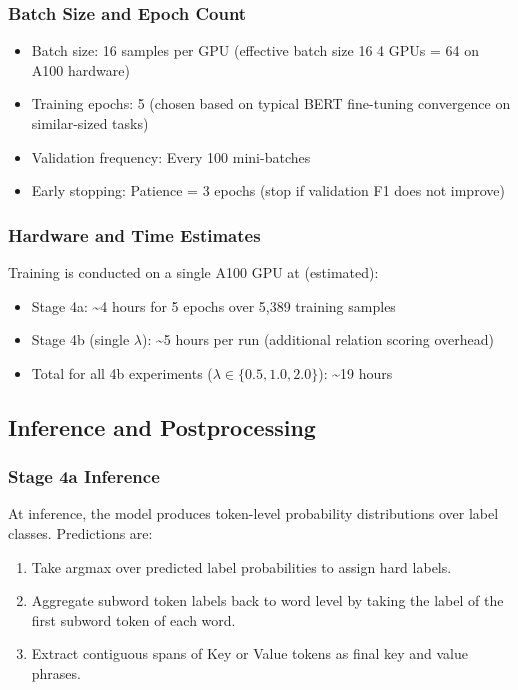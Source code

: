 \subsubsection{Batch Size and Epoch Count}

\begin{itemize}
    \item Batch size: 16 samples per GPU (effective batch size 16 \texttimes{} 4 GPUs = 64 on A100 hardware)
    \item Training epochs: 5 (chosen based on typical BERT fine-tuning convergence on similar-sized tasks)
    \item Validation frequency: Every 100 mini-batches
    \item Early stopping: Patience = 3 epochs (stop if validation F1 does not improve)
\end{itemize}

\subsubsection{Hardware and Time Estimates}

Training is conducted on a single A100 GPU at (estimated):

\begin{itemize}
    \item Stage 4a: \textasciitilde 4 hours for 5 epochs over 5,389 training samples
    \item Stage 4b (single $\lambda$): \textasciitilde 5 hours per run (additional relation scoring overhead)
    \item Total for all 4b experiments ($\lambda \in \{0.5, 1.0, 2.0\}$): \textasciitilde 19 hours
\end{itemize}

\subsection{Inference and Postprocessing}
\label{sec:stage4_inference}

\subsubsection{Stage 4a Inference}

At inference, the model produces token-level probability distributions over label classes. Predictions are:

\begin{enumerate}
    \item Take argmax over predicted label probabilities to assign hard labels.
    \item Aggregate subword token labels back to word level by taking the label of the first subword token of each word.
    \item Extract contiguous spans of Key or Value tokens as final key and value phrases.
\end{enumerate}

